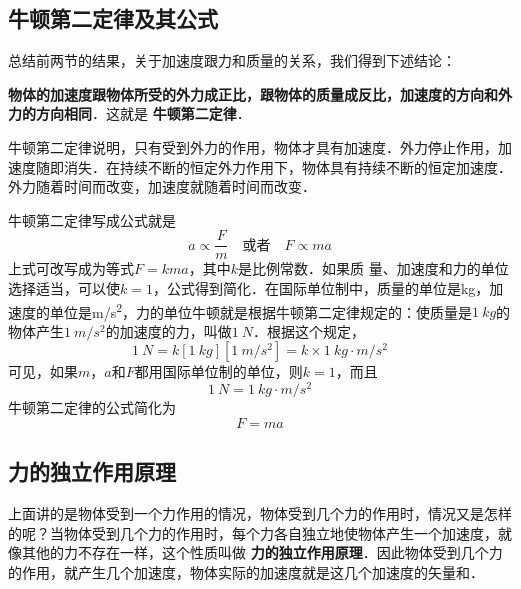 \begin{Test}
\subsection{牛顿第二定律及其公式}

总结前两节的结果，关于加速度跟力和质量的关系，我们得到下述结论：

\textbf{ 物体的加速度跟物体所受的外力成正比，跟物体的质量成反比，加速度的方向和外力的方向相同}．这就是\textbf{ 牛顿第二定律}．

牛顿第二定律说明，只有受到外力的作用，物体才具有加速度．外力停止作用，加速度随即消失．在持续不断的恒定外力作用下，物体具有持续不断的恒定加速度．外力随着时间而改变，加速度就随着时间而改变．

牛顿第二定律写成公式就是
\[a\propto \frac{F}{m}\quad \text{或者}\quad F\propto ma \]
上式可改写成为等式$F=kma$，其中$k$是比例常数．如果质
量、加速度和力的单位选择适当，可以使$k=1$，公式得到简化．在国际单位制中，质量的单位是\si{kg}，加速度的单位是\si{m/s^2}，力的单位牛顿就是根据牛顿第二定律规定的：使质量是$\SI{1}{kg}$的物体产生$\SI{1}{m/s^2}$的加速度的力，叫做$\SI{1}{N}$．根据这个规定，
\begin{equation*}
    \SI{1}{N}=k[\SI{1}{kg}][\SI{1}{m/s^2}]=k\times \SI{1}{kg\cdot m/s^2}
\end{equation*}
可见，如果$m$，$a$和$F$都用国际单位制的单位，则$k=1$，而且
\begin{equation}
    \SI{1}{N}=\SI{1}{kg\cdot m/s^2}
\end{equation}
牛顿第二定律的公式简化为
\begin{equation}
    F=ma
\end{equation}

\subsection{力的独立作用原理}
上面讲的是物体受到一个力作用的情况，物体受到几个力的作用时，情况又是怎样的呢？当物体受到几个力的作用时，每个力各自独立地使物体产生一个加速度，就像其他的力不存在一样，这个性质叫做\textbf{ 力的独立作用原理}．因此物体受到几个力的作用，就产生几个加速度，物体实际的加速度就是这几个加速度的矢量和．
\begin{figure}[H]\centering
    \caption{}
\end{figure}


\end{Test}
